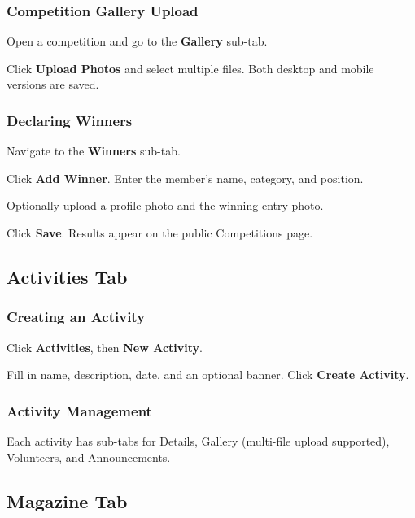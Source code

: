 \documentclass[12pt,a4paper]{article}
\begin{document}
\subsubsection{Competition Gallery Upload}
\begin{steps}
\item Open a competition and go to the \textbf{Gallery} sub-tab.
\item Click \textbf{Upload Photos} and select multiple files. Both desktop and mobile versions are saved.
\end{steps}

\subsubsection{Declaring Winners}
\begin{steps}
\item Navigate to the \textbf{Winners} sub-tab.
\item Click \textbf{Add Winner}. Enter the member's name, category, and position.
\item Optionally upload a profile photo and the winning entry photo.
\item Click \textbf{Save}. Results appear on the public Competitions page.
\end{steps}

\subsection{Activities Tab}

\subsubsection{Creating an Activity}
\begin{steps}
\item Click \textbf{Activities}, then \textbf{New Activity}.
\item Fill in name, description, date, and an optional banner. Click \textbf{Create Activity}.
\end{steps}

\subsubsection{Activity Management}
Each activity has sub-tabs for Details, Gallery (multi-file upload supported), Volunteers, and Announcements.

\subsection{Magazine Tab}
\end{document}

